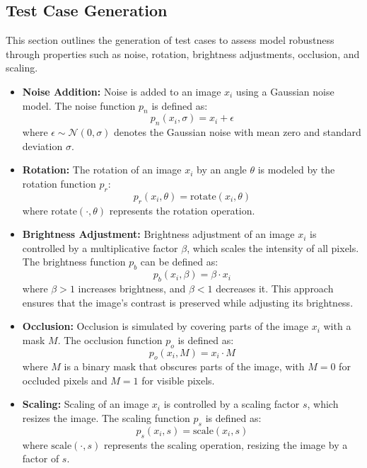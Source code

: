 \documentclass[10pt, conference, a4paper, final]{IEEEtran}
\begin{document}
\subsection{Test Case Generation}

This section outlines the generation of test cases to assess model robustness through properties such as noise, rotation, brightness adjustments, occlusion, and scaling.

\begin{itemize}
    \item \textbf{Noise Addition:} Noise is added to an image \( x_i \) using a Gaussian noise model. The noise function \( p_n \) is defined as:
    \[ p_n(x_i, \sigma) = x_i + \epsilon \]
    where \( \epsilon \sim \mathcal{N}(0, \sigma) \) denotes the Gaussian noise with mean zero and standard deviation \(\sigma\).

    \item \textbf{Rotation:} The rotation of an image \( x_i \) by an angle \(\theta\) is modeled by the rotation function \( p_r \):
    \[ p_r(x_i, \theta) = \text{rotate}(x_i, \theta) \]
    where \(\text{rotate}(\cdot, \theta)\) represents the rotation operation.

    \item \textbf{Brightness Adjustment:} Brightness adjustment of an image \( x_i \) is controlled by a multiplicative factor \( \beta \), which scales the intensity of all pixels. The brightness function \( p_b \) can be defined as:
    \[ p_b(x_i, \beta) = \beta \cdot x_i \]
    where \( \beta > 1 \) increases brightness, and \( \beta < 1 \) decreases it. This approach ensures that the image's contrast is preserved while adjusting its brightness.

    \item \textbf{Occlusion:} Occlusion is simulated by covering parts of the image \( x_i \) with a mask \( M \). The occlusion function \( p_o \) is defined as:
    \[ p_o(x_i, M) = x_i \cdot M \]
    where \( M \) is a binary mask that obscures parts of the image, with \( M = 0 \) for occluded pixels and \( M = 1 \) for visible pixels.

    \item \textbf{Scaling:} Scaling of an image \( x_i \) is controlled by a scaling factor \( s \), which resizes the image. The scaling function \( p_s \) is defined as:
    \[ p_s(x_i, s) = \text{scale}(x_i, s) \]
    where \(\text{scale}(\cdot, s)\) represents the scaling operation, resizing the image by a factor of \( s \).
\end{itemize}
\end{document}
